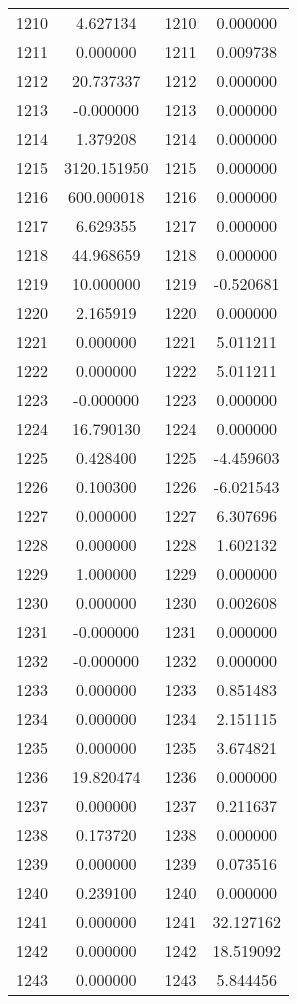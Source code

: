 \documentclass[12pt]{article}
\begin{document}
\begin{longtable}{@{}cccc@{}}
1210 & 4.627134 & 1210 & 0.000000 \\
1211 & 0.000000 & 1211 & 0.009738 \\
1212 & 20.737337 & 1212 & 0.000000 \\
1213 & -0.000000 & 1213 & 0.000000 \\
1214 & 1.379208 & 1214 & 0.000000 \\
1215 & 3120.151950 & 1215 & 0.000000 \\
1216 & 600.000018 & 1216 & 0.000000 \\
1217 & 6.629355 & 1217 & 0.000000 \\
1218 & 44.968659 & 1218 & 0.000000 \\
1219 & 10.000000 & 1219 & -0.520681 \\
1220 & 2.165919 & 1220 & 0.000000 \\
1221 & 0.000000 & 1221 & 5.011211 \\
1222 & 0.000000 & 1222 & 5.011211 \\
1223 & -0.000000 & 1223 & 0.000000 \\
1224 & 16.790130 & 1224 & 0.000000 \\
1225 & 0.428400 & 1225 & -4.459603 \\
1226 & 0.100300 & 1226 & -6.021543 \\
1227 & 0.000000 & 1227 & 6.307696 \\
1228 & 0.000000 & 1228 & 1.602132 \\
1229 & 1.000000 & 1229 & 0.000000 \\
1230 & 0.000000 & 1230 & 0.002608 \\
1231 & -0.000000 & 1231 & 0.000000 \\
1232 & -0.000000 & 1232 & 0.000000 \\
1233 & 0.000000 & 1233 & 0.851483 \\
1234 & 0.000000 & 1234 & 2.151115 \\
1235 & 0.000000 & 1235 & 3.674821 \\
1236 & 19.820474 & 1236 & 0.000000 \\
1237 & 0.000000 & 1237 & 0.211637 \\
1238 & 0.173720 & 1238 & 0.000000 \\
1239 & 0.000000 & 1239 & 0.073516 \\
1240 & 0.239100 & 1240 & 0.000000 \\
1241 & 0.000000 & 1241 & 32.127162 \\
1242 & 0.000000 & 1242 & 18.519092 \\
1243 & 0.000000 & 1243 & 5.844456 \\

\end{longtable}
\end{document}
